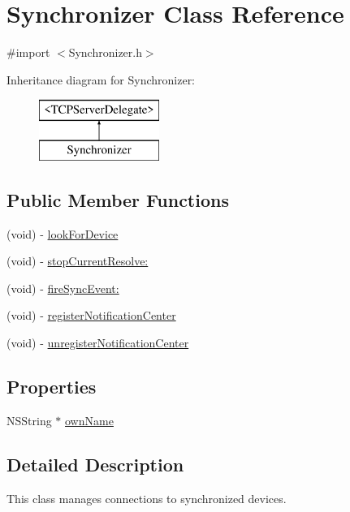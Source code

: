 \hypertarget{interface_synchronizer}{
\section{Synchronizer Class Reference}
\label{interface_synchronizer}
}


{\ttfamily \#import $<$Synchronizer.h$>$}

Inheritance diagram for Synchronizer:\begin{figure}[H]
\begin{center}
\leavevmode
\includegraphics[height=2.000000cm]{interface_synchronizer}
\end{center}
\end{figure}
\subsection*{Public Member Functions}
\begin{DoxyCompactItemize}
\item 
(void) -\/ \hyperlink{interface_synchronizer_a98e362afffd0b73137550ab1186ba7af}{lookForDevice}
\item 
(void) -\/ \hyperlink{interface_synchronizer_af6aafc04d0194fac34ea8afc8da70d1a}{stopCurrentResolve:}
\item 
(void) -\/ \hyperlink{interface_synchronizer_aedd53710a9acd0572fecfc839215a661}{fireSyncEvent:}
\item 
(void) -\/ \hyperlink{interface_synchronizer_a7f364c94977e770c78f9b2e1001c2a87}{registerNotificationCenter}
\item 
(void) -\/ \hyperlink{interface_synchronizer_ab8fb10dd91608c47c056d05c7dea49d2}{unregisterNotificationCenter}
\end{DoxyCompactItemize}
\subsection*{Properties}
\begin{DoxyCompactItemize}
\item 
NSString $\ast$ \hyperlink{interface_synchronizer_a309302494c6ea19d6c181d53684f9207}{ownName}
\end{DoxyCompactItemize}


\subsection{Detailed Description}
This class manages connections to synchronized devices.


